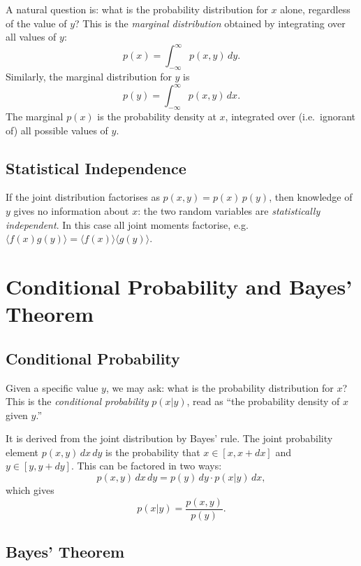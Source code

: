 A natural question is: what is the probability distribution for $x$ alone, regardless of the value of $y$? This is the \emph{marginal distribution} obtained by integrating over all values of $y$:
\begin{equation}
    p(x) = \int_{-\infty}^{\infty} p(x,y)\,dy.
\end{equation}
Similarly, the marginal distribution for $y$ is
\begin{equation}
    p(y) = \int_{-\infty}^{\infty} p(x,y)\,dx.
\end{equation}
The marginal $p(x)$ is the probability density at $x$, integrated over (i.e.\ ignorant of) all possible values of $y$.

\subsection{Statistical Independence}

If the joint distribution factorises as $p(x,y) = p(x)\,p(y)$, then knowledge of $y$ gives no information about $x$: the two random variables are \emph{statistically independent}. In this case all joint moments factorise, e.g.\ $\langle f(x)g(y)\rangle = \langle f(x)\rangle\langle g(y)\rangle$.

\section{Conditional Probability and Bayes' Theorem}

\subsection{Conditional Probability}

Given a specific value $y$, we may ask: what is the probability distribution for $x$? This is the \emph{conditional probability} $p(x|y)$, read as ``the probability density of $x$ given $y$.''

It is derived from the joint distribution by Bayes' rule. The joint probability element $p(x,y)\,dx\,dy$ is the probability that $x \in [x, x+dx]$ and $y \in [y, y+dy]$. This can be factored in two ways:
\begin{equation}
    p(x,y)\,dx\,dy = p(y)\,dy \cdot p(x|y)\,dx,
\end{equation}
which gives
\begin{equation}
    \boxed{p(x|y) = \frac{p(x,y)}{p(y)}.}
\end{equation}

\subsection{Bayes' Theorem}

